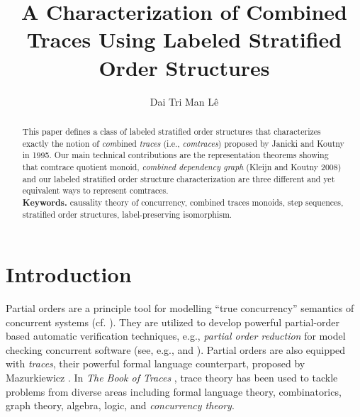 \documentclass{llncs}
\begin{document}
\newcommand{\secref}[1]{Section~\ref{sec:#1}}
\newcommand{\eqnref}[1]{Eq.~(\ref{eq:#1})}
\newcommand{\TCT}{\stackrel{\mathsf{t}\leftrightsquigarrow \mathsf{c}}{\equiv}}



\newcommand{\EOD}{\hfill {\scriptsize }}





\title{A Characterization of Combined Traces Using  Labeled Stratified Order Structures}

\author{Dai Tri Man L\^e}



\maketitle
\pagestyle{headings} 
\begin{abstract}
This paper defines a class of labeled stratified order structures that characterizes exactly the notion of \emph{com}bined \emph{traces} (i.e., \emph{comtraces}) proposed by Janicki and Koutny in 1995. Our main technical contributions are the representation theorems showing that comtrace quotient monoid,  \emph{combined dependency graph} (Kleijn and Koutny 2008) and our labeled stratified order structure characterization are three different and yet equivalent ways to represent comtraces.\\
\textbf{Keywords. } causality theory of concurrency, combined traces monoids, step sequences, stratified order structures, label-preserving isomorphism.
\end{abstract}



\section{Introduction}
Partial orders are a principle tool for modelling ``true concurrency'' semantics of concurrent systems (cf. \cite{Pra}). They are utilized to develop powerful partial-order based automatic verification techniques, e.g.,  \emph{partial order reduction} for model checking concurrent software (see, e.g., \cite[Chapter 10]{CGP} and \cite{EH}). Partial orders are also equipped with \emph{traces}, their powerful formal language counterpart,  proposed by Mazurkiewicz \cite{Ma1}. In  \emph{The Book of Traces} \cite{DR}, trace theory has been used to tackle problems from diverse areas including formal language theory, combinatorics, graph theory, algebra, logic, and \emph{concurrency theory}.
\end{document}
